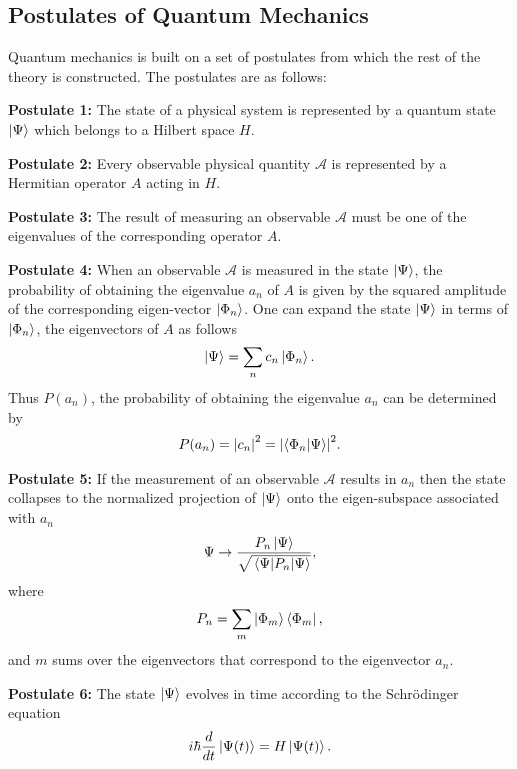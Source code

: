 \documentclass[10pt]{article}
\begin{document}
\subsection{Postulates of Quantum Mechanics}

Quantum mechanics is built on a set of postulates from which the rest of the theory is constructed. The postulates are as follows:

\textbf{Postulate 1:} The state of a physical system is represented by a quantum state $\ket{\Psi}$ which belongs to a Hilbert space $H$. 

\textbf{Postulate 2:} Every observable physical quantity $\mathcal{A}$ is represented by a Hermitian operator $A$ acting in $H$.

\textbf{Postulate 3:} The result of measuring an observable $\mathcal{A}$ must be one of the eigenvalues of the corresponding operator $A$.

\textbf{Postulate 4:} When an observable $\mathcal{A}$ is measured in the state $\ket{\Psi}$, the probability of obtaining the eigenvalue $a_n$ of $A$ is given by the squared amplitude of the corresponding eigen-vector $\ket{\Phi_n}$. One can expand the state $\ket{\Psi}$ in terms of $\ket{\Phi_n}$, the eigenvectors of $A$ as follows
\begin{align}
\ket{\Psi}=\sum_{n}c_n\ket{\Phi_n}.
\end{align}
Thus $P(a_n)$, the probability of obtaining the eigenvalue $a_n$ can be determined by
\begin{align}
P(a_n)=\abs{c_n}^2=\abs{\bra{\Phi_n}\ket{\Psi}}^2.
\end{align}

\textbf{Postulate 5:} If the measurement of an observable $\mathcal{A}$ results in $a_n$ then the state collapses to the normalized projection of $\ket{\Psi}$ onto the eigen-subspace associated with $a_n$
\begin{align}
\Psi \to \frac{P_n\ket{\Psi}}{\sqrt{\mel{\Psi}{P_n}{\Psi}}},
\end{align}
where
\begin{align}
P_n=\sum_{m}\ket{\Phi_m}\bra{\Phi_m},
\end{align}
and $m$ sums over the eigenvectors that correspond to the eigenvector $a_n$.

\textbf{Postulate 6:} 
The state $\ket{\Psi}$ evolves in time according to the Schr\"{o}dinger equation
\begin{align}
\label{postulate_6}
i\hbar\frac{d}{dt}\ket{\Psi(t)}=H\ket{\Psi(t)}.
\end{align}
\end{document}
